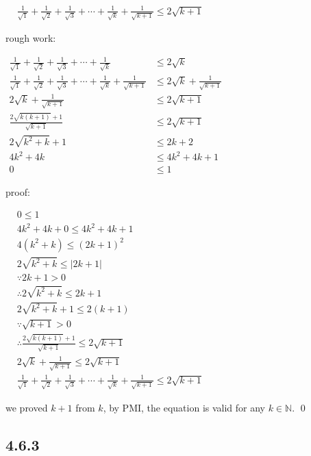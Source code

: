 \documentclass{article}
\begin{document}
$\begin{aligned}&\frac{1}{\sqrt{1}}+\frac{1}{\sqrt{2}}+\frac{1}{\sqrt{3}}+\cdots+\frac{1}{\sqrt{k}}+\frac{1}{\sqrt{k+1}}\leq2\sqrt{k+1}\end{aligned}$

rough work:

\begin{center}
    $\begin{aligned}\frac1{\sqrt{1}}+\frac1{\sqrt{2}}+\frac1{\sqrt{3}}+\cdots+\frac1{\sqrt{k}}&\leq2\sqrt{k}\\\frac1{\sqrt{1}}+\frac1{\sqrt{2}}+\frac1{\sqrt{3}}+\cdots+\frac1{\sqrt{k}}+\frac1{\sqrt{k+1}}&\leq2\sqrt{k}+\frac{1}{\sqrt{k+1}}\\2\sqrt{k}+\frac1{\sqrt{k+1}}&\leq2\sqrt{k+1}\\\frac{2\sqrt{k(k+1)}+1}{\sqrt{k+1}}&\leq2\sqrt{k+1}\\2\sqrt{k^2+k}+1&\leq2k+2\\4k^2+4k&\leq4k^2+4k+1\\0&\leq1\end{aligned}$
\end{center}

proof:
\begin{center}
    $\begin{aligned}
&0\leq1 \\
& 4k^{2}+4k+0\leq4k^{2}+4k+1  \\
&4(k^{2}+k)\leq(2k+1)^{2} \\
&2\sqrt{k^{2}+k}\leq|2k+1| \\
&\because2k+1>0 \\
&\therefore2\sqrt{k^{2}+k}\leq2k+1 \\
&2\sqrt{k^{2}+k}+1\leq2(k+1) \\
&\because\sqrt{k+1}>0 \\
&\therefore\frac{2\sqrt{k(k+1)}+1}{\sqrt{k+1}}\leq2\sqrt{k+1} \\
&2\sqrt{k}+\frac{1}{\sqrt{k+1}}\leq2\sqrt{k+1} \\
&\frac{1}{\sqrt{1}}+\frac{1}{\sqrt{2}}+\frac{1}{\sqrt{3}}+\cdots+\frac{1}{\sqrt{k}}+\frac{1}{\sqrt{k+1}}\leq2\sqrt{k+1}
\end{aligned}$
\end{center}

we proved $k+1$ from $k$, by PMI, the equation is valid for any $k\in \mathbb{N}$. \qed

\subsection*{4.6.3}
\end{document}
